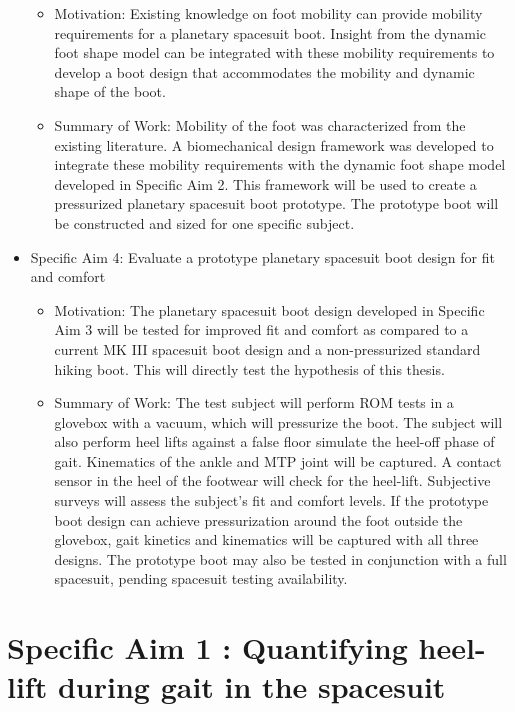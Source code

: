 \documentclass[defaultstyle,11pt]{comps}
\providecommand{\tightlist}{%
  \setlength{\itemsep}{0pt}\setlength{\parskip}{0pt}}
\begin{document}
\begin{itemize}
  \begin{itemize}
  \tightlist
  \item
    Motivation: Existing knowledge on foot mobility can provide mobility requirements for a planetary spacesuit boot. Insight from the dynamic foot shape model can be integrated with these mobility requirements to develop a boot design that accommodates the mobility and dynamic shape of the boot.
  \item
    Summary of Work: Mobility of the foot was characterized from the existing literature. A biomechanical design framework was developed to integrate these mobility requirements with the dynamic foot shape model developed in Specific Aim 2. This framework will be used to create a pressurized planetary spacesuit boot prototype. The prototype boot will be constructed and sized for one specific subject.
  \end{itemize}
\item
  Specific Aim 4: Evaluate a prototype planetary spacesuit boot design for fit and comfort

  \begin{itemize}
  \tightlist
  \item
    Motivation: The planetary spacesuit boot design developed in Specific Aim 3 will be tested for improved fit and comfort as compared to a current MK III spacesuit boot design and a non-pressurized standard hiking boot. This will directly test the hypothesis of this thesis.
  \item
    Summary of Work: The test subject will perform ROM tests in a glovebox with a vacuum, which will pressurize the boot. The subject will also perform heel lifts against a false floor simulate the heel-off phase of gait. Kinematics of the ankle and MTP joint will be captured. A contact sensor in the heel of the footwear will check for the heel-lift. Subjective surveys will assess the subject's fit and comfort levels. If the prototype boot design can achieve pressurization around the foot outside the glovebox, gait kinetics and kinematics will be captured with all three designs. The prototype boot may also be tested in conjunction with a full spacesuit, pending spacesuit testing availability.
  \end{itemize}
\end{itemize}

\hypertarget{specific-aim-1-quantifying-heel-lift-during-gait-in-the-spacesuit}{%
\chapter{Specific Aim 1 : Quantifying heel-lift during gait in the spacesuit}\label{specific-aim-1-quantifying-heel-lift-during-gait-in-the-spacesuit}}
\end{document}
